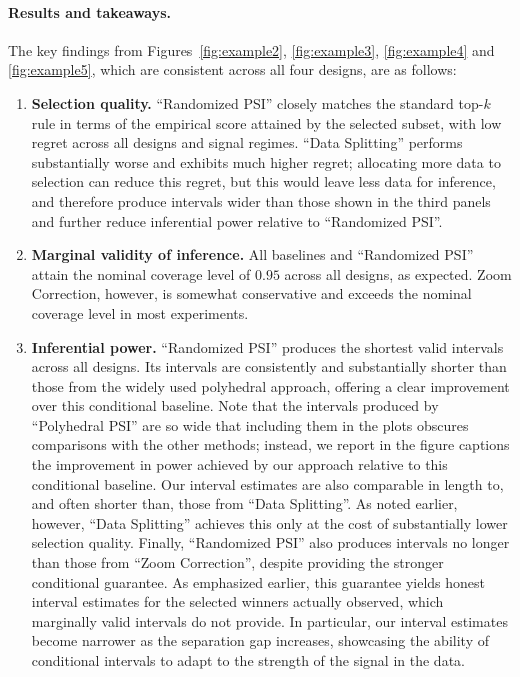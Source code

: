 \documentclass[12pt]{article}
\begin{document}
\paragraph{Results and takeaways.}
The key findings from Figures~\ref{fig:example2}, \ref{fig:example3}, \ref{fig:example4} and \ref{fig:example5}, which are consistent across all four designs, are as follows:
\begin{enumerate}[leftmargin=*]
\item \textbf{Selection quality.} ``Randomized PSI'' closely matches the standard top-$k$ rule in terms of the empirical score attained by the selected subset, with low regret across all designs and signal regimes. ``Data Splitting'' performs substantially worse and exhibits much higher regret; allocating more data to selection can reduce this regret, but this would leave less data for inference, and therefore produce intervals wider than those shown in the third panels and further reduce inferential power relative to ``Randomized PSI''.
\item \textbf{Marginal validity of inference.} All baselines and ``Randomized PSI'' attain the nominal coverage level of $0.95$ across all designs, as expected. Zoom Correction, however, is somewhat conservative and exceeds the nominal coverage level in most experiments.
\item \textbf{Inferential power.} ``Randomized PSI'' produces the shortest valid intervals across all designs. Its intervals are consistently and substantially shorter than those from the widely used polyhedral approach, offering a clear improvement over this conditional baseline. Note that the intervals produced by ``Polyhedral PSI'' are so wide that including them in the plots obscures comparisons with the other methods; instead, we report in the figure captions the improvement in power achieved by our approach relative to this conditional baseline.
Our interval estimates are also comparable in length to, and often shorter than, those from ``Data Splitting''. As noted earlier, however, ``Data Splitting'' achieves this only at the cost of substantially lower selection quality.
Finally, ``Randomized PSI'' also produces intervals no longer than those from ``Zoom Correction'', despite providing the stronger conditional guarantee. As emphasized earlier, this guarantee yields honest interval estimates for the selected winners actually observed, which marginally valid intervals do not provide.
In particular, our interval estimates become narrower as the separation gap increases, showcasing the ability of conditional intervals to adapt to the strength of the signal in the data.
\end{enumerate}
\end{document}
